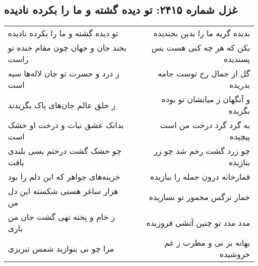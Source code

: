 \begin{center}
\section*{غزل شماره ۲۴۱۵: تو دیده گشته و ما را بکرده نادیده}
\label{sec:2415}
\begin{longtable}{l p{0.5cm} r}
تو دیده گشته و ما را بکرده نادیده
&&
بدیده گریه ما را بدین بخندیده
\\
بخند جان و جهان چون مقام خنده تو راست
&&
بکن که هر چه کنی هست بس پسندیده
\\
ز درد و حسرت تو جان لاله‌ها سیه است
&&
گل از جمال رخ توست جامه بدریده
\\
ز خلق عالم جان‌های پاک بگزیدند
&&
و آنگهان ز میانشان تو بوده بگزیده
\\
بدانک عشق نبات و درخت او خشک است
&&
به گرد گرد درخت من است پیچیده
\\
چو خشک گشت درختم بسی بلندی یافت
&&
چو زرد گشت رخم شد چو زر بنازیده
\\
خزینه‌های جواهر که این دلم را بود
&&
قمارخانه درون جمله را ببازیده
\\
هزار ساغر هستی شکسته این دل من
&&
خمار نرگس مخمور تو نسازیده
\\
ز خام و پخته تهی گشت جان من باری
&&
مدد مدد تو چنین آتشی فروزیده
\\
مرا چو نی بنوازید شمس تبریزی
&&
بهانه بر نی و مطرب ز غم خروشیده
\\
\end{longtable}
\end{center}
